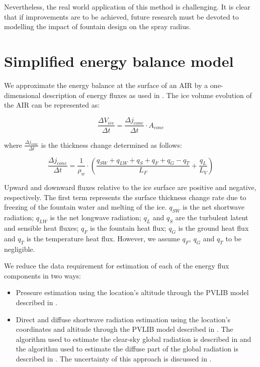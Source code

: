 \documentclass[tc, manuscript]{copernicus}
\begin{document}
Nevertheless, the real world application of this method is challenging. It is clear that if improvements are to
be achieved, future research must be devoted to modelling the impact of fountain design on the spray radius.

\appendix

\section{Simplified energy balance model}

We approximate the energy balance at the surface of an AIR by a one-dimensional description of energy fluxes as
used in \cite{balasubramanianInfluenceMeteorologicalConditions2022}. The ice volume evolution of the AIR can be
represented as: 

\begin{equation}
  \frac{\Delta V_{ice}}{\Delta t}  =  \frac{\Delta j_{cone}}{ \Delta t} \cdot A_{cone}
	\label{eqn:freeze}
\end{equation}

where $\frac{\Delta j_{cone}}{\Delta t}$ is the thickness change determined as follows:

\begin{equation}
  \frac{\Delta j_{cone}}{\Delta t}  = \frac{1}{\rho_w} \cdot (\frac{q_{SW} + q_{LW} + q_{S} + q_{F} + q_{G} -
  q_{T}}{L_F} + \frac{q_{L}}{L_V} )
	\label{eqn:freeze}
\end{equation}

Upward and downward fluxes relative to the ice surface are positive and negative, respectively. The first term
represents the surface thickness change rate due to freezing of the fountain water and melting of the ice.
$q_{SW}$ is the net shortwave radiation; $q_{LW}$ is the net longwave radiation; $q_{L}$ and $q_{S}$ are the
turbulent latent and sensible heat fluxes; $q_{F}$ is the fountain heat flux; $q_{G}$ is the ground heat flux
and $q_{T}$ is the temperature heat flux. However, we assume $q_{F}$, $q_{G}$ and $q_{T}$ to be negligible.

We reduce the data requirement for estimation of each of the energy flux components in two ways:

\begin{itemize}
  \item Pressure estimation using the location's altitude through the PVLIB model described in
    \citet{holmgrenPvlibPythonPython2018}.
  \item Direct and diffuse shortwave radiation estimation using the location's coordinates and altitude through the
    PVLIB model described in \citet{holmgrenPvlibPythonPython2018}. The algorithm used to estimate the
    clear-sky global radiation is described in \citet{ineichenBroadbandSimplifiedVersion2008} and the algorithm
    used to estimate the diffuse part of the global radiation is described in
\citet{erbsEstimationDiffuseRadiation1982}. The uncertainty of this approach is discussed in
\cite{ineichenValidationModelsThat2016}. 
\end{itemize}
\end{document}
